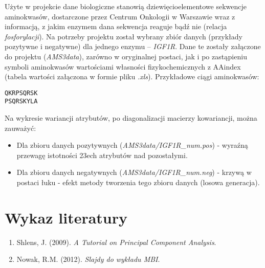 \documentclass{article}
\begin{document}
Użyte w projekcie dane biologiczne stanowią dziewięcioelementowe sekwencje aminokwasów, dostarczone przez Centrum Onkologii w Warszawie wraz z informacją, z jakim enzymem dana sekwencja reaguje bądź nie (relacja \emph{fosforylacji}). Na potrzeby projektu został wybrany zbiór danych (przykłady pozytywne i negatywne) dla jednego enzymu -- \emph{IGF1R}. Dane te zostały załączone do projektu (\emph{AMS3data}), zarówno w oryginalnej postaci, jak i po zastąpieniu symboli aminokwasów wartościami własności fizykochemicznych z AAindex (tabela wartości załączona w formie pliku \emph{.xls}). Przykładowe ciągi aminokwasów:
\begin{verbatim}
QKRPSQRSK
PSQRSKYLA
\end{verbatim}
\noindent Na wykresie wariancji atrybutów, po diagonalizacji macierzy kowariancji, można zauważyć:
\begin{itemize}
\item{Dla zbioru danych pozytywnych (\emph{AMS3data/IGF1R\_num.pos}) - wyraźną przewagę istotności 23ech atrybutów nad pozostałymi.}
\item{Dla zbioru danych negatywnych (\emph{AMS3data/IGF1R\_num.neg}) - krzywą w postaci łuku - efekt metody tworzenia tego zbioru danych (losowa generacja).}
\end{itemize}

\section{Wykaz literatury}

\begin{enumerate}

\item Shlens, J. (2009). \emph{A Tutorial on Principal Component Analysis}.
\item Nowak, R.M. (2012). \emph{Slajdy do wykładu MBI}.

\end{enumerate}
\end{document}
